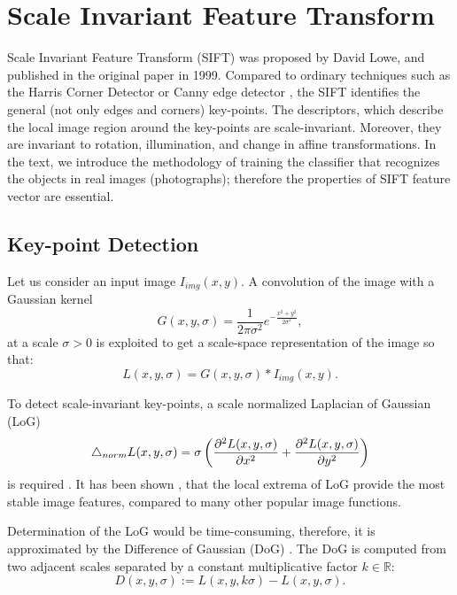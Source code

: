 \section{Scale Invariant Feature Transform}
Scale Invariant Feature Transform (SIFT) was proposed by David Lowe, and published in the original paper \cite{Lowe1999} in 1999. Compared to ordinary techniques such as the Harris Corner Detector \cite{Harris1988} or Canny edge detector \cite{Canny1986}, the SIFT identifies the general (not only edges and corners) key-points. The descriptors, which describe the local image region around the key-points are scale-invariant. Moreover, they are invariant to rotation, illumination, and change in affine transformations. In the text, we introduce the methodology of training the classifier that recognizes the objects in real images (photographs); therefore the properties of SIFT feature vector are essential.

\subsection{Key-point Detection}

Let us consider an input image \( I_{img}(x,y) \). A convolution of the image with a Gaussian kernel
\begin{equation}
    G(x,y,\sigma) = \frac{1}{2\pi\sigma^2}e^{-\frac{x^2+y^2}{2\sigma^2}},
    \label{eq:Gaussian_kernel}
\end{equation}
at a scale \( \sigma > 0 \) is exploited to get a scale-space representation of the image so that:
\begin{equation}
    L(x, y,\sigma) =  G(x,y,\sigma)*I_{img}(x,y).
\end{equation}

To detect scale-invariant key-points, a scale normalized Laplacian of Gaussian (LoG)
\begin{equation}
    \mathop{}\!\mathbin\bigtriangleup_{norm} L(x, y, \sigma) = \sigma\left(\frac{\partial^2 L(x,y,\sigma)}{\partial x^2} + \frac{\partial^2 L(x,y,\sigma)}{\partial y^2}\right)
\end{equation}
is required \cite{Koenderink1984}. It has been shown \cite{Mikolajczyk2002}, that the local extrema of LoG provide the most stable image features, compared to many other popular image functions.

Determination of the LoG would be time-consuming, therefore, it is approximated by the Difference of Gaussian (DoG) \cite{Lowe2004}. The DoG is computed from two adjacent scales separated by a constant multiplicative factor $k \in \mathbb{R}$:
\begin{equation}
    D(x,y,\sigma) := L(x,y,k\sigma) - L(x,y,\sigma).
\end{equation}

